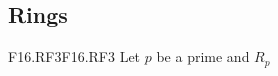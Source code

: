 \documentclass[../AlgebraQualSolutions.tex]{subfiles}
\begin{document}
\subsection{Rings}

\begin{prob}{F16.RF3}{F16.RF3}
    Let $p$ be a prime and $R_p$ 
\end{prob}
\end{document}

